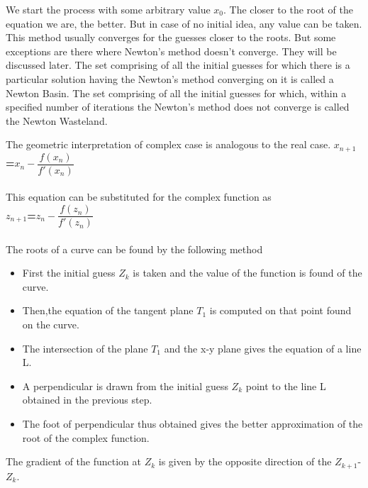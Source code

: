 \documentclass[15pt]{report}
\begin{document}
We start the process with some arbitrary value $x_{0}$. The closer to the root of the equation we are, the better. But in case of no initial idea, any value can be taken. This method usually converges for the guesses closer to the roots. But some exceptions are there where Newton's method doesn't converge. They will be discussed later.
The set comprising of all the initial guesses for which there is a particular solution having the Newton's method converging on it is called a Newton Basin.
The set comprising of all the initial guesses for which, within a specified number of iterations the Newton's method does not converge is called the Newton Wasteland.

The geometric interpretation of complex case is analogous to the real case. 
{\textbf{\Large $x_{n+1}$=$x_{n}-\dfrac{f(x_{n})}{f'(x_{n})}$}}\\ \\
This equation can be substituted for the complex function as\\
{\textbf{\Large $z_{n+1}$=$z_{n}-\dfrac{f(z_{n})}{f'(z_{n})}$}}\\ \\
The roots of a curve can be found by the following method
\begin{itemize}
\item First the initial guess $Z_{k}$ is taken and the value of the function is found of the curve.
\item Then,the equation of the tangent plane $T_{1}$ is computed on that point found on the curve.
\item The intersection of the plane $T_{1}$ and the x-y plane gives the equation of a line L.
\item A perpendicular is drawn from the initial guess $Z_{k}$ point to the line L obtained in the previous step.
\item The foot of perpendicular thus obtained gives the better approximation of the root of the complex function.

\end{itemize}
The gradient of the function at $Z_{k}$ is given by the opposite direction of the $Z_{k+1}$-$Z_{k}$.\\ \\
\end{document}
